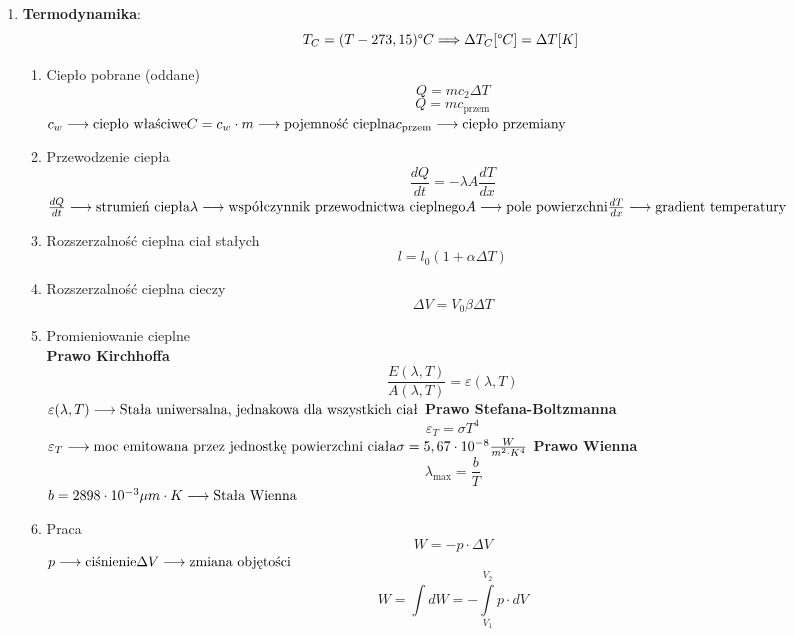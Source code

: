 \documentclass{article}
\begin{document}
\begin{enumerate}
		\item \textbf{Termodynamika}:
		\[
		T_C = (T - 273,15) \text{\textdegree} C \Longrightarrow \Delta T_C[\text{\textdegree} C] = \Delta T [K]
		\]
		\begin{enumerate}
			\item Ciepło pobrane (oddane)
			\[
			Q = mc_2 \Delta T
			\]
			\[
			Q = mc_\text{przem}
			\]
			$
			c_w \longrightarrow \text{ciepło właściwe} \\
			C = c_w \cdot m \longrightarrow \text{pojemność cieplna} \\
			c_\text{przem} \longrightarrow \text{ciepło przemiany} \\
			$
			\item Przewodzenie ciepła
			\[
			\frac{dQ}{dt} = - \lambda A \frac{dT}{dx}
			\]
			$
			\frac{dQ}{dt} \longrightarrow \text{strumień ciepła} \\
			\lambda \longrightarrow \text{współczynnik przewodnictwa cieplnego} \\
			A \longrightarrow \text{pole powierzchni} \\
			\frac{dT}{dx} \longrightarrow \text{gradient temperatury} \\
			$
			\newpage
			\item Rozszerzalność cieplna ciał stałych
			\[
			l = l_0 (1 + \alpha \Delta T)
			\]
			\item Rozszerzalność cieplna cieczy
			\[
			\Delta V = V_0 \beta \Delta T
			\]
			\item Promieniowanie cieplne \\
			\textbf{Prawo Kirchhoffa}
			\[
			\frac{E (\lambda, T)}{A (\lambda, T)} = \varepsilon (\lambda, T)
			\]
			$
			\varepsilon (\lambda, T) \longrightarrow \text{Stała uniwersalna, jednakowa dla wszystkich ciał} \\
			$
			\textbf{Prawo Stefana-Boltzmanna}
			\[
			\varepsilon_T = \sigma T^4
			\]
			$
			\varepsilon_T \longrightarrow \text{moc emitowana przez jednostkę powierzchni ciała} \\
			\sigma = 5,67 \cdot 10^{-8} \frac{W}{m^2 \cdot K^4} \\
			$
			\textbf{Prawo Wienna}
			\[
			\lambda_\text{max} = \frac{b}{T}
			\]
			$
			b = 2898 \cdot 10^{-3} \mu m \cdot K \longrightarrow \text{Stała Wienna} \\
			$
			\item Praca
			\[
			W = -p \cdot \Delta V
			\]
			$
			p \longrightarrow \text{ciśnienie} \\
			\Delta V \longrightarrow \text{zmiana objętości} \\
			$
			\[
			W = \int dW = - \int\limits_{V_1}^{V_2} p \cdot dV
			\]
		\end{enumerate}
		

\end{enumerate}
\end{document}

